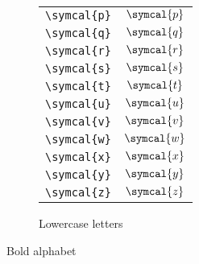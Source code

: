 \begin{figure}[htbp]
\begin{subfigure}{.5\textwidth}
\begin{tabular}{cc}
            \verb|\symcal{p}| & \(\symcal{p}\) \\
            \verb|\symcal{q}| & \(\symcal{q}\) \\
            \verb|\symcal{r}| & \(\symcal{r}\) \\
            \verb|\symcal{s}| & \(\symcal{s}\) \\
            \verb|\symcal{t}| & \(\symcal{t}\) \\
            \verb|\symcal{u}| & \(\symcal{u}\) \\
            \verb|\symcal{v}| & \(\symcal{v}\) \\
            \verb|\symcal{w}| & \(\symcal{w}\) \\
            \verb|\symcal{x}| & \(\symcal{x}\) \\
            \verb|\symcal{y}| & \(\symcal{y}\) \\
            \verb|\symcal{z}| & \(\symcal{z}\) \\
            \bottomrule
        \end{tabular}
        \caption{Lowercase letters}
        \label{fig:lowercase}
    \end{subfigure}
    \caption{Bold alphabet}
    \label{fig:bold_alphabet}
\end{figure}


